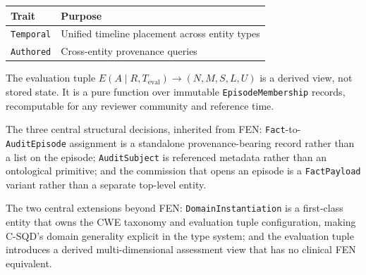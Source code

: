 \documentclass[11pt]{article}
\begin{document}
\begin{center}
\renewcommand{\arraystretch}{1.3}
\begin{tabular}{l l}
\textbf{Trait} & \textbf{Purpose} \\
\hline
\texttt{Temporal} & Unified timeline placement across entity types \\
\texttt{Authored}  & Cross-entity provenance queries \\
\end{tabular}
\end{center}

The evaluation tuple $E(A \mid R, T_\text{eval}) \to (N, M, S, L, U)$ is a
derived view, not stored state. It is a pure function over immutable
\texttt{EpisodeMembership} records, recomputable for any reviewer community and
reference time.

The three central structural decisions, inherited from FEN:
\texttt{Fact}-to-\texttt{AuditEpisode} assignment is a standalone
provenance-bearing record rather than a list on the episode;
\texttt{AuditSubject} is referenced metadata rather than an ontological
primitive; and the commission that opens an episode is a \texttt{FactPayload}
variant rather than a separate top-level entity.

The two central extensions beyond FEN: \texttt{DomainInstantiation} is a
first-class entity that owns the CWE taxonomy and evaluation tuple
configuration, making C-SQD's domain generality explicit in the type system;
and the evaluation tuple introduces a derived multi-dimensional assessment
view that has no clinical FEN equivalent.
\end{document}
